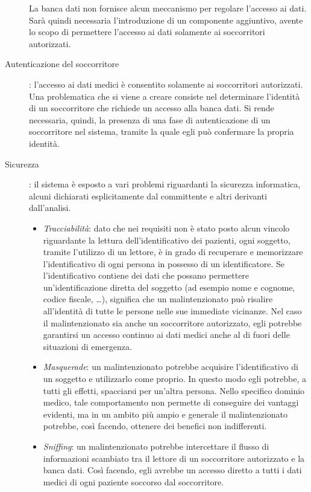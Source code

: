 \documentclass[a4paper,12pt]{report}
\begin{document}
\begin{description}
	La banca dati non fornisce alcun meccanismo per regolare l'accesso ai dati. Sarà quindi necessaria l'introduzione di un componente aggiuntivo, avente lo scopo di permettere l'accesso ai dati solamente ai soccorritori autorizzati.
	
	\item[Autenticazione del soccorritore]: l'accesso ai dati medici è consentito solamente ai soccorritori autorizzati. Una problematica che si viene a creare consiste nel determinare l'identità di un soccorritore che richiede un accesso alla banca dati. Si rende necessaria, quindi, la presenza di una fase di autenticazione di un soccorritore nel sistema, tramite la quale egli può confermare la propria identità.
	
	\item[Sicurezza]: il sistema è esposto a vari problemi riguardanti la sicurezza informatica, alcuni dichiarati esplicitamente dal committente e altri derivanti dall'analisi. 
	\begin{itemize}
		\item \emph{Tracciabilità}: dato che nei requisiti non è stato posto alcun vincolo riguardante la lettura dell'identificativo dei pazienti, ogni soggetto, tramite l'utilizzo di un lettore, è in grado di recuperare e memorizzare l'identificativo di ogni persona in possesso di un identificatore. Se l'identificativo contiene dei dati che possano permettere un'identificazione diretta del soggetto (ad esempio nome e cognome, codice fiscale, \dots), significa che un malintenzionato può risalire all'identità di tutte le persone nelle sue immediate vicinanze. Nel caso il malintenzionato sia anche un soccorritore autorizzato, egli potrebbe garantirsi un accesso continuo ai dati medici anche al di fuori delle situazioni di emergenza.
		\item \emph{Masquerade}: un malintenzionato potrebbe acquisire l'identificativo di un soggetto e utilizzarlo come proprio. In questo modo egli potrebbe, a tutti gli effetti, spacciarsi per un'altra persona. Nello specifico dominio medico, tale comportamento non permette di conseguire dei vantaggi evidenti, ma in un ambito più ampio e generale il malintenzionato potrebbe, così facendo, ottenere dei benefici non indifferenti. 
		\item \emph{Sniffing}: un malintenzionato potrebbe intercettare il flusso di informazioni scambiato tra il lettore di un soccorritore autorizzato e la banca dati. Così facendo, egli avrebbe un accesso diretto a tutti i dati medici di ogni paziente soccorso dal soccorritore.

\end{itemize}
\end{description}
\end{document}
